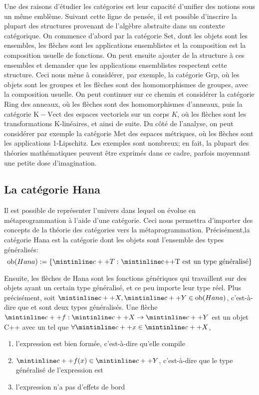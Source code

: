 Une des raisons d'étudier les catégories est leur capacité d'unifier des
notions sous un même emblème. Suivant cette ligne de pensée, il est possible
d'inscrire la plupart des structures provenant de l'algèbre abstraite dans
un contexte catégorique. On commence d'abord par la catégorie $\mathrm{Set}$,
dont les objets sont les ensembles, les flèches sont les applications
ensemblistes et la composition est la composition usuelle de fonctions.
On peut ensuite ajouter de la structure à ces ensembles et demander que
les applications ensemblistes respectent cette structure. Ceci nous mène
à considérer, par exemple, la catégorie $\mathrm{Grp}$, où les objets sont
les groupes et les flèches sont des homomorphismes de groupes, avec la
composition usuelle. On peut continuer sur ce chemin et considérer la
catégorie $\mathrm{Ring}$ des anneaux, où les flèches sont des homomorphismes
d'anneaux, puis la catégorie $\mathrm{K-Vect}$ des espaces vectoriels sur un
corps $K$, où les flèches sont les transformations K-linéaires, et ainsi de
suite. Du côté de l'analyse, on peut considérer par exemple la catégorie
$\mathrm{Met}$ des espaces métriques, où les flèches sont les applications
1-Lipschitz. Les exemples sont nombreux; en fait, la plupart des théories
mathématiques peuvent être exprimés dans ce cadre, parfois moyennant une
petite dose d'imagination.


\subsection{La catégorie Hana}
Il est possible de représenter l'univers dans lequel on évolue en
métaprogrammation à l'aide d'une catégorie. Ceci nous permettra
d'importer des concepts de la théorie des catégories vers la
métaprogrammation. Précisément,la catégorie Hana est la catégorie dont les
objets sont l'ensemble des types généralisés:
\[
    \ob(Hana) := \{ \icpp{T} \, \suchthat \text{\icpp{T} est un type généralisé} \}
\]

Ensuite, les flèches de Hana sont les fonctions génériques qui travaillent sur
des objets ayant un certain type généralisé, et ce peu importe leur type réel.
Plus précisément, soit $\icpp{X}, \icpp{Y} \in \ob(Hana)$, c'est-à-dire que
 et  sont deux types généralisés. Une flèche
$\icpp{f} : \icpp{X} \to \icpp{Y}$ est un objet C++ avec un 
tel que $\forall \icpp{x} \in \icpp{X}$,
\begin{enumerate}
    \item l'expression  est bien formée, c'est-à-dire qu'elle compile
    \item $\icpp{f(x)} \in \icpp{Y}$, c'est-à-dire que le type généralisé de l'expression  est 
    \item l'expression  n'a pas d'effets de bord
\end{enumerate}

